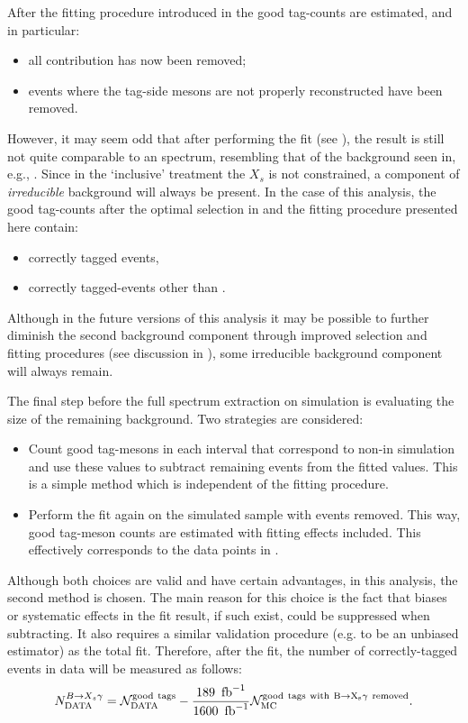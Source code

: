 After the fitting procedure introduced in  the good tag-\B counts are estimated, and in particular:
\begin{itemize}
    \item all \epem\ra\qqbar contribution has now been removed;
    \item events where the tag-side \B mesons are not properly reconstructed have been removed.
\end{itemize}

However, it may seem odd that after performing the \Mbc fit (see ), the result is still not quite comparable to an \EB spectrum,
resembling that of the background seen in, e.g., .
Since in the `inclusive' treatment the $X_s$ is not constrained, a component of \textit{irreducible} background will always be present.
In the case of this analysis, the good tag-\B counts after the optimal selection in  and the fitting procedure presented here contain:
\begin{itemize}
    \item correctly tagged \BtoXsgamma events,
    \item correctly tagged-\BB events other than \BtoXsgamma.
\end{itemize}
Although in the future versions of this analysis it may be possible to further diminish the second background component through improved selection and fitting procedures (see discussion in ), 
some irreducible background component will always remain.

The final step before the full \BtoXsgamma spectrum extraction on simulation is evaluating the size of the remaining \BB background.
Two strategies are considered:
\begin{itemize}
    \item Count good tag-\B mesons in each \EB interval that correspond to non-\BtoXsgamma in simulation and use these values to subtract remaining \BB events from the fitted values.
    This is a simple method which is independent of the fitting procedure.
    \item Perform the fit again on the simulated sample with \BtoXsgamma events removed.
    This way, good tag-\B meson counts are estimated with fitting effects included.
    This effectively corresponds to the data points in .
\end{itemize}
Although both choices are valid and have certain advantages, in this analysis, the second method is chosen.
The main reason for this choice is the fact that biases or systematic effects in the fit result, if such exist, could be suppressed when subtracting.
It also requires a similar validation procedure (e.g. to be an unbiased estimator) as the total fit.
Therefore, after the \Mbc fit, the number of correctly-tagged \BtoXsgamma events in data will be measured as follows:
\begin{equation}\label{eq:background_subtraction}
    N_{\mathrm{DATA}}^{\BtoXsgamma} = \mathcal{N}_{\mathrm{DATA}}^{\mathrm{good~tags}}  - \frac{189~\invfb}{1600~\invfb} \mathcal{N}_{\mathrm{MC}}^{\mathrm{good~tags~with~\BtoXsgamma~removed}}.
\end{equation}